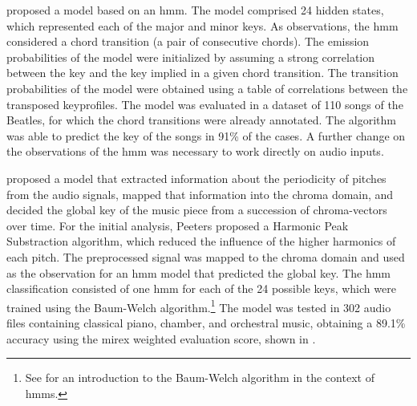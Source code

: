 \textcite{noland2006key} proposed a model based on an
\gls{hmm}. The model comprised 24 hidden states, which
represented each of the major and minor keys. As
observations, the \gls{hmm} considered a chord transition (a
pair of consecutive chords). The emission probabilities of
the model were initialized by assuming a strong correlation
between the key and the key implied in a given chord
transition. The transition probabilities of the model were
obtained using a table of correlations between the
transposed \textcite{krumhansl1982tracing}
\gls{keyprofile}s. The model was evaluated in a dataset of
110 songs of the Beatles, for which the chord transitions
were already annotated. The algorithm was able to predict
the key of the songs in 91\% of the cases. A further change
on the observations of the \gls{hmm} was necessary to work
directly on audio inputs.


\textcite{peeters2006chromabased} proposed a model that
extracted information about the periodicity of pitches from
the audio signals, mapped that information into the chroma
domain, and decided the global key of the music piece from a
succession of chroma-vectors over time. For the initial
analysis, Peeters proposed a Harmonic Peak Substraction
algorithm, which reduced the influence of the higher
harmonics of each pitch. The preprocessed signal was mapped
to the chroma domain and used as the observation for an
\gls{hmm} model that predicted the global key. The \gls{hmm}
classification consisted of one \gls{hmm} for each of the 24
possible keys, which were trained using the Baum-Welch
algorithm.\footnote{See \textcite{rabiner1989tutorial} for
an introduction to the Baum-Welch algorithm in the context
of \glspl{hmm}.} The model was tested in 302 audio files
containing classical piano, chamber, and orchestral music,
obtaining a 89.1\% accuracy using the \gls{mirex} weighted
evaluation score, shown in .


